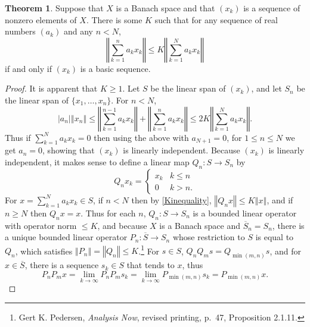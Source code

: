 \documentclass{article}
\newcommand{\norm}[1]{\left\Vert #1 \right\Vert}
\theoremstyle{definition}
\newtheorem{theorem}{Theorem}
\theoremstyle{definition}
\begin{document}
\begin{theorem}
Suppose that $X$ is a Banach space and that $(x_k)$ is a sequence of nonzero elements of $X$. 
There is some $K$ such that for any sequence of real numbers $(a_k)$ and any $n<N$,
\begin{equation}
\norm{\sum_{k=1}^n a_k x_k} \leq K \norm{\sum_{k=1}^N a_k x_k}
\label{Kinequality}
\end{equation}
if and only if $(x_k)$ is a basic sequence.
\end{theorem}
\begin{proof}
It is apparent that $K \geq 1$.
Let $S$ be the linear span of $(x_k)$, and let $S_n$ be the linear span of $\{x_1,\ldots,x_n\}$.
For $n<N$, 
\begin{equation}
|a_n| \norm{x_n} \leq
\norm{\sum_{k=1}^{n-1} a_k x_k}
+\norm{\sum_{k=1}^n a_k x_k}
\leq 2K \norm{\sum_{k=1}^N a_k x_k}.
\label{2K}
\end{equation}
Thus if $\sum_{k=1}^N a_k x_k=0$ then using the above with
$a_{N+1}=0$, for $1 \leq n \leq N$ we get $a_n=0$, showing that
$(x_k)$ is linearly independent. 
Because $(x_k)$ is linearly independent, it makes sense to define a linear map $Q_n:S \to S_n$ by
\[
Q_n x_k = \begin{cases}
x_k&k \leq n\\
0&k > n.
\end{cases}
\]
For $x=\sum_{k=1}^N a_k x_k \in S$, if $n<N$ then by \eqref{Kinequality},
$\norm{Q_n x} \leq K \norm{x}$, and if $n \geq N$ then $Q_n x = x$. Thus 
for each $n$, $Q_n:S \to S_n$ is a bounded linear operator with operator norm $\leq 
K$, and because $X$ is a Banach space and $\overline{S}_n=S_n$,
there is a unique bounded linear operator $P_n:\overline{S} \to S_n$ whose restriction to $S$ is equal
to $Q_n$, which satisfies  $\norm{P_n}=\norm{Q_n} \leq K$.\footnote{Gert K. Pedersen, {\em Analysis Now}, revised
printing, p.~47, Proposition 2.1.11.}
For $s \in S$, $Q_n Q_m  s = Q_{\min(m,n)} s$, and
for $x \in \overline{S}$, there is a sequence $s_k \in S$ 
that tends to $x$, thus
\begin{equation}
P_nP_m x = \lim_{k \to \infty} P_n P_m s_k = 
\lim_{k \to \infty} P_{\min(m,n)} s_k
=P_{\min(m,n)} x.
\label{Pmin}
\end{equation}



\end{proof}
\end{document}
